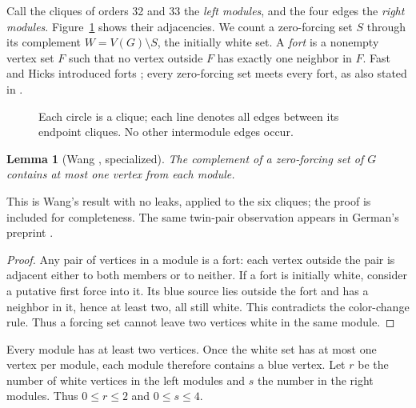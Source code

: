 \documentclass[11pt]{article}
\newtheorem{lemma}[theorem]{Lemma}
\begin{document}
Call the cliques of orders 32 and 33 the \emph{left modules}, and the
four edges the \emph{right modules}. Figure~\ref{fig:graph} shows their
adjacencies. We count a zero-forcing set $S$ through its complement
$W=V(G)\setminus S$, the initially white set. A \emph{fort} is a nonempty
vertex set $F$ such that no vertex outside $F$ has exactly one neighbor
in $F$. Fast and Hicks introduced forts \cite{fast-hicks}; every
zero-forcing set meets every fort, as also stated in
\cite[Proposition 2.3]{wang}.

\begin{figure}[ht]
\centering
{}
\caption{Each circle is a clique; each line denotes all edges between
its endpoint cliques. No other intermodule edges occur.}
\label{fig:graph}
\end{figure}

\begin{lemma}[Wang {\cite[Lemma 3.5]{wang}}, specialized]\label{lem:pair}
The complement of a zero-forcing set of $G$ contains at most one vertex
from each module.
\end{lemma}
This is Wang's result with no leaks, applied to the six cliques;
the proof is included for completeness. The same twin-pair observation
appears in German's preprint \cite[Section 3, Lemma 7]{german}.
\begin{proof}
Any pair of vertices in a module is a fort: each vertex outside the pair
is adjacent either to both members or to neither. If a fort is initially
white, consider a putative first force into it. Its blue source lies
outside the fort and has a neighbor in it, hence at least two, all still
white. This contradicts the color-change rule. Thus a forcing set cannot leave
two vertices white in the same module.
\end{proof}

Every module has at least two vertices. Once the white set has at most
one vertex per module, each module therefore contains a blue vertex.
Let $r$ be the number of white vertices in the left modules and $s$ the
number in the right modules. Thus $0\leq r\leq2$ and $0\leq s\leq4$.
\end{document}
